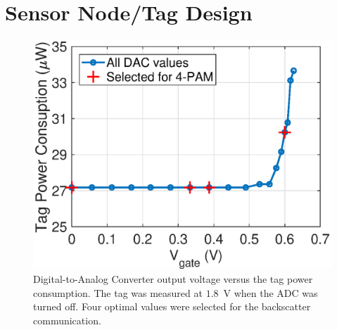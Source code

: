 \documentclass[journal]{IEEEtran}
\begin{document}
\section{Sensor Node/Tag Design}
\label{Sec:tag}
\begin{figure}[t]
\centering
\includegraphics[width=0.8\columnwidth]{Figures/Fig4.eps}
\caption{Digital-to-Analog Converter   output voltage versus the tag power consumption. The tag was measured at $1.8$~V  when the ADC was turned off.
Four optimal  values were selected for the backscatter communication.}
\label{fig:dac_volts}
\end{figure}
%
\end{document}
